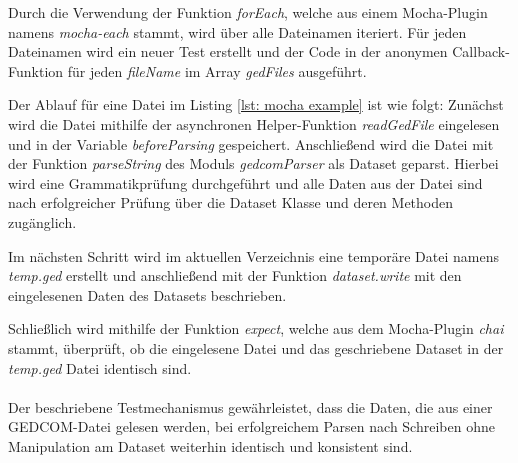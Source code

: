 Durch die Verwendung der Funktion \textit{forEach}, welche aus einem Mocha-Plugin namens \textit{mocha-each} stammt, wird über alle Dateinamen iteriert. 
Für jeden Dateinamen wird ein neuer Test erstellt und der Code in der anonymen Callback-Funktion für jeden \textit{fileName} im Array \textit{gedFiles} 
ausgeführt.

Der Ablauf für eine Datei im Listing \ref{lst: mocha example} ist wie folgt: Zunächst wird die Datei mithilfe der asynchronen Helper-Funktion 
\textit{readGedFile} eingelesen und in der Variable \textit{beforeParsing} gespeichert. Anschließend wird die Datei mit der Funktion 
\textit{parseString} des Moduls \textit{gedcomParser} als Dataset geparst. Hierbei wird eine Grammatikprüfung durchgeführt und alle Daten aus der Datei sind
nach erfolgreicher Prüfung über die Dataset Klasse und deren Methoden zugänglich.

Im nächsten Schritt wird im aktuellen Verzeichnis eine temporäre Datei namens \textit{temp.ged} erstellt und anschließend mit der Funktion 
\textit{dataset.write} mit den eingelesenen Daten des Datasets beschrieben.

Schließlich wird mithilfe der Funktion \textit{expect}, welche aus dem Mocha-Plugin \textit{chai} stammt, überprüft, ob die eingelesene 
Datei und das geschriebene Dataset in der \textit{temp.ged} Datei identisch sind.
\\\\
Der beschriebene Testmechanismus gewährleistet, dass die Daten, die aus einer GEDCOM-Datei gelesen werden, bei erfolgreichem Parsen nach 
Schreiben ohne Manipulation am Dataset weiterhin identisch und konsistent sind.
\\\\

